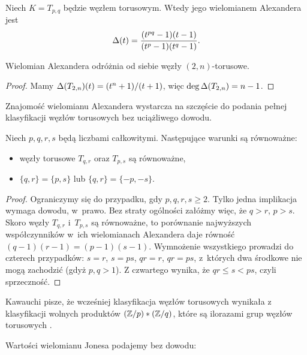 \begin{corollary}
    Niech $K = T_{p, q}$ będzie węzłem torusowym.
    Wtedy jego wielomianem Alexandera jest
    \begin{equation}
         \Delta(t) = \frac{(t^{pq}-1)(t-1)}{(t^p-1)(t^q-1)}.
    \end{equation}
\end{corollary}

\begin{corollary}
    Wielomian Alexandera odróżnia od siebie węzły $(2,n)$-torusowe.
\end{corollary}

\begin{proof}
    Mamy $\Delta(T_{2,n})(t) = (t^n+1) / (t+1)$, więc $\deg \Delta (T_{2,n}) = n - 1$.
\end{proof}

Znajomość wielomianu Alexandera wystarcza na szczęście do podania pełnej klasyfikacji węzłów torusowych bez uciążliwego dowodu.

\begin{proposition}
    Niech $p, q, r, s$ będą liczbami całkowitymi.
    Następujące warunki są równoważne:
    \begin{itemize}
        \item węzły torusowe $T_{q, r}$ oraz $T_{p, s}$ są równoważne,
        \item $\{q, r\} = \{p, s\}$ lub $\{q, r\} = \{-p, -s\}$.
    \end{itemize}
\end{proposition}

\begin{proof}
    Ograniczymy się do przypadku, gdy $p, q, r, s \ge 2$.
    Tylko jedna implikacja wymaga dowodu, w~prawo.
    Bez straty ogólności załóżmy więc, że $q > r$, $p > s$.
    Skoro węzły $T_{q, r}$ i~$T_{p,s}$ są równoważne, to porównanie najwyższych współczynników w~ich wielomianach Alexandera daje równość $(q-1)(r-1) = (p-1)(s-1)$.
    Wymnożenie wszystkiego prowadzi do czterech przypadków: $s = r$, $s = ps$, $qr = r$, $qr = ps$, z~których dwa środkowe nie mogą zachodzić (gdyż $p, q > 1$).
    Z czwartego wynika, że $qr \le s < ps$, czyli sprzeczność.
\end{proof}

Kawauchi pisze, że wcześniej klasyfikacja węzłów torusowych wynikała z klasyfikacji wolnych produktów $(\mathbb Z/p) * (\mathbb Z/q)$, które są ilorazami grup węzłów torusowych \cite{schreier24}.

Wartości wielomianu Jonesa podajemy bez dowodu:

